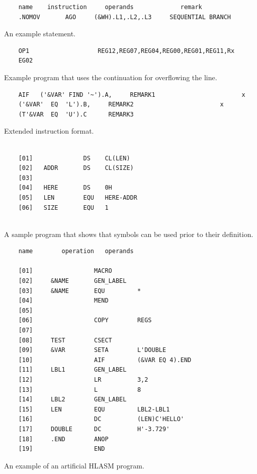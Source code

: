 \begin{listing}[p]
	\begin{verbatim}
	name    instruction     operands             remark
	.NOMOV       AGO     (&WH).L1,.L2,.L3     SEQUENTIAL BRANCH
	\end{verbatim}
	\caption{An example statement.}
	\label{lst:small_example}
\end{listing}

\begin{listing}[p]
	\begin{verbatim}
	OP1                   REG12,REG07,REG04,REG00,REG01,REG11,Rx
	EG02
	\end{verbatim}
	\caption{Example program that uses the continuation for overflowing the line.}
	\label{lst:overflow}
\end{listing}

\begin{listing}[p]
	\begin{verbatim}
	AIF   ('&VAR' FIND '~').A,     REMARK1                        x
	('&VAR'  EQ  'L').B,     REMARK2                        x
	(T'&VAR  EQ  'U').C      REMARK3 
	\end{verbatim}
	\caption{Extended instruction format.}
	\label{lst:extended}
\end{listing}

\begin{listing}[p]
	\begin{verbatim}
	
	[01]              DS    CL(LEN)
	[02]   ADDR       DS    CL(SIZE)
	[03]
	[04]   HERE       DS    0H
	[05]   LEN        EQU   HERE-ADDR
	[06]   SIZE       EQU   1
	
	\end{verbatim}
	\caption{A sample program that shows that symbols can be used prior to their definition.}
	\label{lst:ordinary_assembly}
\end{listing}

\begin{listing}
	\begin{verbatim}
	name        operation   operands
	
	[01]                 MACRO                   
	[02]     &NAME       GEN_LABEL
	[03]     &NAME       EQU         *
	[04]                 MEND
	[05]             
	[06]                 COPY        REGS
	[07]             
	[08]     TEST        CSECT
	[09]     &VAR        SETA        L'DOUBLE
	[10]                 AIF         (&VAR EQ 4).END
	[11]     LBL1        GEN_LABEL
	[12]                 LR          3,2
	[13]                 L           8
	[14]     LBL2        GEN_LABEL
	[15]     LEN         EQU         LBL2-LBL1
	[16]                 DC          (LEN)C'HELLO'
	[17]     DOUBLE      DC          H'-3.729'
	[18]     .END        ANOP
	[19]                 END
	\end{verbatim} 
	\caption{An example of an artificial HLASM program.}
	\label{lst:example}
\end{listing}

